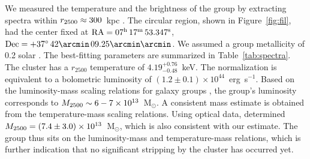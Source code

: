 We measured the temperature and the brightness of the group by extracting spectra within $r_{\rm 2500} \approx 300$~kpc \citep{Medezinski2013}. The circular region, shown in Figure~\ref{fig:fil}, had the center fixed at ${\rm RA} = 07^{\rm h}\, 17^{\rm m}\, 53.347^{\rm s}$, ${\rm Dec} = +37^{\circ}\, 42\arcmin \, 09.25\arcmin\arcmin$. We assumed a group metallicity of 0.2 solar \citep[e.g.,][]{Rasmussen2007}. The best-fitting parameters are summarized in Table~\ref{tab:spectra}. The cluster has a $r_{2500}$ temperature of $4.19_{-0.48}^{+0.76}$~keV. The normalization is equivalent to a bolometric luminosity of $(1.2\pm 0.1) \times 10^{44}$~erg~s$^{-1}$. Based on the luminosity-mass scaling relations for galaxy groups \citep[e.g.,][]{Connor2014}, the group's luminosity corresponds to $M_{\rm 2500} \sim 6-7\times 10^{13}$~M$_\odot$. A consistent mass estimate is obtained from the temperature-mass scaling relations.  Using optical data, \citet{Medezinski2013} determined $M_{\rm 2500} = (7.4\pm 3.0) \times 10^{13}$~M$_\odot$, which is also consistent with our estimate. The group thus sits on the luminosity-mass and temperature-mass relations, which is further indication that no significant stripping by the cluster has occurred yet.
